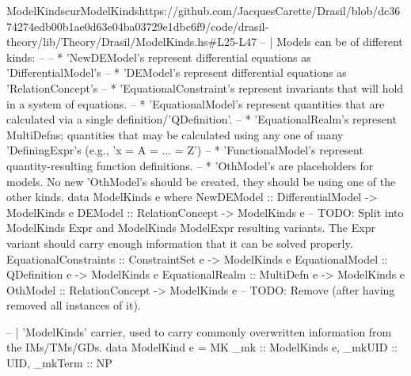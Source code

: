 \begin{haskell}{ModelKinds}{curModelKinds}{https://github.com/JacquesCarette/Drasil/blob/dc3674274edb00b1ae0d63e04ba03729e1dbc6f9/code/drasil-theory/lib/Theory/Drasil/ModelKinds.hs\#L25-L47}
-- | Models can be of different kinds: 
--
--     * 'NewDEModel's represent differential equations as 'DifferentialModel's
--     * 'DEModel's represent differential equations as 'RelationConcept's
--     * 'EquationalConstraint's represent invariants that will hold in a system of equations.
--     * 'EquationalModel's represent quantities that are calculated via a single definition/'QDefinition'.
--     * 'EquationalRealm's represent MultiDefns; quantities that may be calculated using any one of many 'DefiningExpr's (e.g., 'x = A = ... = Z')
--     * 'FunctionalModel's represent quantity-resulting function definitions.
--     * 'OthModel's are placeholders for models. No new 'OthModel's should be created, they should be using one of the other kinds.
data ModelKinds e where
  NewDEModel            :: DifferentialModel -> ModelKinds e
  DEModel               :: RelationConcept   -> ModelKinds e -- TODO: Split into ModelKinds Expr and ModelKinds ModelExpr resulting variants. The Expr variant should carry enough information that it can be solved properly.
  EquationalConstraints :: ConstraintSet e   -> ModelKinds e
  EquationalModel       :: QDefinition e     -> ModelKinds e
  EquationalRealm       :: MultiDefn e       -> ModelKinds e
  OthModel              :: RelationConcept   -> ModelKinds e -- TODO: Remove (after having removed all instances of it).


-- | 'ModelKinds' carrier, used to carry commonly overwritten information from the IMs/TMs/GDs.
data ModelKind e = MK {
  _mk     :: ModelKinds e,
  _mkUID  :: UID,
  _mkTerm :: NP
}
\end{haskell}

